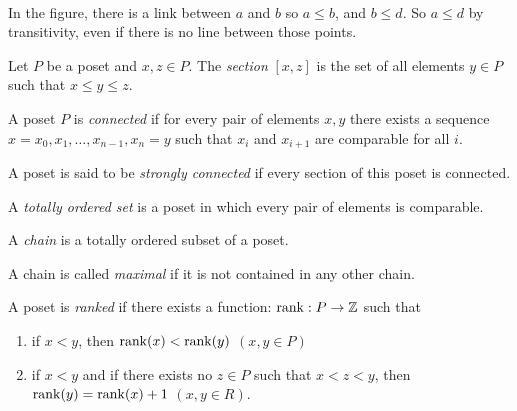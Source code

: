\paragraph{}
In the figure, there is a link between $a$ and $b$ so $a \le b$, and $b \le d$. So $a \le d$ by transitivity, even if there is no line between those points.

\begin{definition}[Section]
  Let $P$ be a poset and $x, z \in P$. The \textit{section} $[x,z]$ is the set of all elements $y \in P$ such that $x \le y \le z$.
\end{definition}

\begin{definition}
  A poset $P$ is \textit{connected} if for every pair of elements $x, y$ there exists a sequence $x = x_0, x_1, \dots, x_{n-1}, x_n = y$ such that $x_i$ and $x_{i+1}$ are comparable for all $i$.
\end{definition}

\begin{definition}
  A poset is said to be \textit{strongly connected} if every section of this poset is connected.
\end{definition}


\begin{definition}
  A \textit{totally ordered set} is a poset in which every pair of elements is comparable.
\end{definition}

\begin{definition}[Chain]
  A \textit{chain} is a totally ordered subset of a poset.
\end{definition}

\begin{definition}
  A chain is called \textit{maximal} if it is not contained in any other chain.
\end{definition}

\begin{definition}
  A poset is \textit{ranked} if there exists a function: $\operatorname{rank} : P \to \mathbb Z$ such that
  \begin{enumerate}
    \item if $x < y$, then $\operatorname{rank}(x) < \operatorname{rank}(y)$ $(x, y \in P)$
    \item if $x < y$ and if there exists no $z \in P$ such that $x < z < y$, then $\operatorname{rank}(y) = \operatorname{rank}(x) + 1$ $(x, y \in R)$.
  \end{enumerate}
\end{definition}

